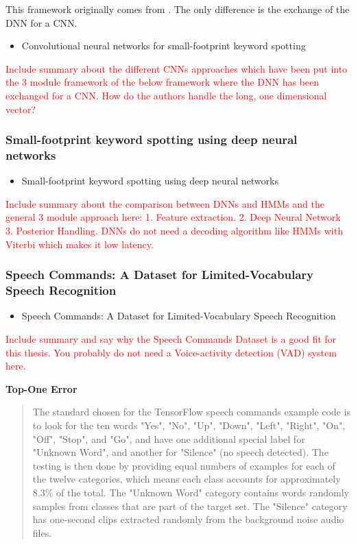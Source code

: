 \documentclass{article}
\theoremstyle{definition}
\theoremstyle{remark}
\begin{document}
This framework originally comes from \cite{chen2014small}. The only difference is the exchange of the DNN for a CNN.



\begin{itemize}
	\item Convolutional neural networks for small-footprint keyword spotting \cite{sainath2015convolutional}
\end{itemize}	

\textcolor{red}{Include summary about the different CNNs approaches which have been put into the 3 module framework of the below framework where the DNN has been exchanged for a CNN. How do the authors handle the long, one dimensional vector?}

\subsubsection{Small-footprint keyword spotting using deep neural networks}

\begin{itemize}
	\item Small-footprint keyword spotting using deep neural networks \cite{chen2014small}
\end{itemize}	

\textcolor{red}{Include summary about the comparison between DNNs and HMMs and the general 3 module approach here: 1. Feature extraction. 2. Deep Neural Network 3. Posterior Handling. DNNs do not need a decoding algorithm like HMMs with Viterbi which makes it low latency.}

\subsubsection{Speech Commands: A Dataset for Limited-Vocabulary Speech Recognition}


\begin{itemize}
	\item Speech Commands: A Dataset for Limited-Vocabulary Speech Recognition \cite{warden2018speech}
\end{itemize}	

\textcolor{red}{Include summary and say why the Speech Commands Dataset is a good fit for this thesis. You probably do not need a Voice-activity detection (VAD) system here.}




\textbf{Top-One Error}

\begin{quote}
The standard chosen for the TensorFlow speech commands example code is to look for the ten words "Yes", "No", "Up", "Down", "Left", "Right", "On", "Off", "Stop", and "Go", and have one additional special label for "Unknown Word", and another for "Silence" (no speech detected). The testing is then done by providing equal numbers of examples for each of the twelve categories, which means each class accounts for approximately 8.3\% of the total. The "Unknown Word" category contains words randomly samples from classes that are part of the target set. The "Silence" category has one-second clips extracted randomly from the background noise audio files.
\end{quote}
\end{document}
